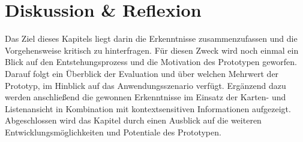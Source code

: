 \documentclass[Bachelorarbeit.tex]{subfiles}
\begin{document}
\chapter{Diskussion \& Reflexion}
\label{chap:reflexion}

\label{chap:reflexion:sec:zusammenfassung}

\begin{comment}
\ideas{Interviews: mehr Personen anderer Modus?}
\ideas{Evaluation Gruppeneinteilung, Modus}
\ideas{Leaflet.js}
\end{comment}


Das Ziel dieses Kapitels liegt darin die Erkenntnisse zusammenzufassen und die Vorgehensweise kritisch zu hinterfragen.
Für diesen Zweck wird noch einmal ein Blick auf den Entstehungsprozess und die Motivation des Prototypen geworfen.
Darauf folgt ein Überblick der Evaluation und über welchen Mehrwert der Prototyp, im Hinblick auf das Anwendungsszenario verfügt.
Ergänzend dazu werden anschließend die gewonnen Erkenntnisse im Einsatz der Karten- und Listenansicht in Kombination mit kontextsensitiven Informationen aufgezeigt.
Abgeschlossen wird das Kapitel durch einen Ausblick auf die weiteren Entwicklungsmöglichkeiten und Potentiale des Prototypen. 
\end{document}
